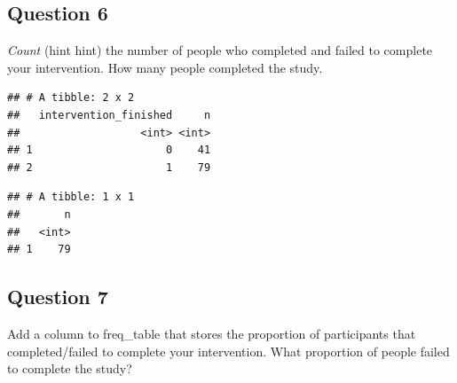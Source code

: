 \documentclass[]{book}
\newenvironment{Shaded}{\begin{snugshade}}{\end{snugshade}}
\newcommand{\CommentTok}[1]{\textcolor[rgb]{0.56,0.35,0.01}{\textit{#1}}}
\newcommand{\DecValTok}[1]{\textcolor[rgb]{0.00,0.00,0.81}{#1}}
\newcommand{\KeywordTok}[1]{\textcolor[rgb]{0.13,0.29,0.53}{\textbf{#1}}}
\newcommand{\NormalTok}[1]{#1}
\newcommand{\OperatorTok}[1]{\textcolor[rgb]{0.81,0.36,0.00}{\textbf{#1}}}
\newcommand{\StringTok}[1]{\textcolor[rgb]{0.31,0.60,0.02}{#1}}
\theoremstyle{definition}
\theoremstyle{definition}
\theoremstyle{definition}
\theoremstyle{remark}
\begin{document}
\hypertarget{question-6-1}{%
\subsection{Question 6}\label{question-6-1}}

\emph{Count} (hint hint) the number of people who completed and failed to complete your intervention. How many people completed the study.

\begin{Shaded}
\end{Shaded}

\begin{verbatim}
## # A tibble: 2 x 2
##   intervention_finished     n
##                   <int> <int>
## 1                     0    41
## 2                     1    79
\end{verbatim}

\begin{Shaded}
\end{Shaded}

\begin{verbatim}
## # A tibble: 1 x 1
##       n
##   <int>
## 1    79
\end{verbatim}

\hypertarget{question-7-1}{%
\subsection{Question 7}\label{question-7-1}}

Add a column to freq\_table that stores the proportion of participants that completed/failed to complete your intervention. What proportion of people failed to complete the study?
\end{document}
